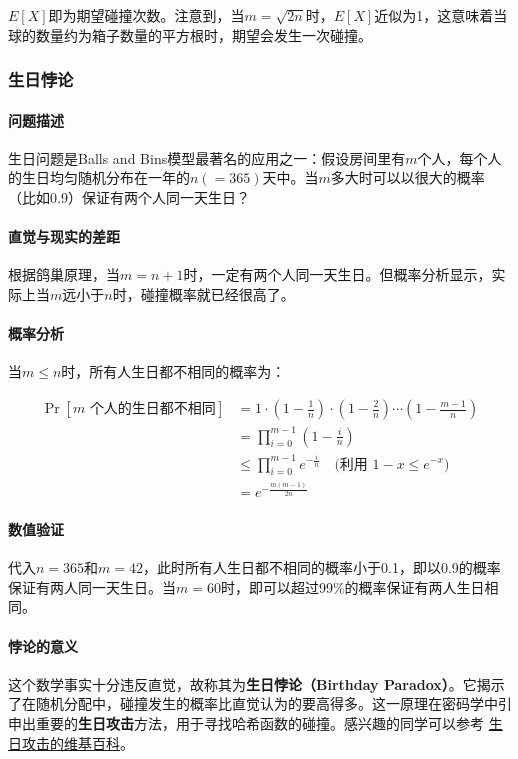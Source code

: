 \documentclass[lang=cn,newtx,10pt,scheme=chinese,chinesefont=nofont,citestyle=gb7714-2015, bibstyle=gb7714-2015]{elegantbook}
\begin{document}
\begin{refsection}
$E[X]$即为期望碰撞次数。注意到，当$m=\sqrt{2n}$时，$E[X]$近似为1，这意味着当球的数量约为箱子数量的平方根时，期望会发生一次碰撞。

\subsubsection{生日悖论}

\paragraph*{问题描述}
生日问题是Balls and Bins模型最著名的应用之一：假设房间里有$m$个人，每个人的生日均匀随机分布在一年的$n(=365)$天中。当$m$多大时可以以很大的概率（比如0.9）保证有两个人同一天生日？

\paragraph*{直觉与现实的差距}
根据鸽巢原理，当$m=n+1$时，一定有两个人同一天生日。但概率分析显示，实际上当$m$远小于$n$时，碰撞概率就已经很高了。

\paragraph*{概率分析}
当$m\le n$时，所有人生日都不相同的概率为：

\begin{align*}
\Pr[\text{$m$ 个人的生日都不相同}] &= 1\cdot\left(1-\frac{1}{n}\right)\cdot\left(1-\frac{2}{n}\right)\cdots\left(1-\frac{m-1}{n}\right) \\
&= \prod_{i=0}^{m-1}\left(1-\frac{i}{n}\right) \\
&\le \prod_{i=0}^{m-1}e^{-\frac{i}{n}} \quad \text{(利用 $1-x \le e^{-x}$)} \\
&= e^{-\frac{m(m-1)}{2n}}
\end{align*}

\paragraph*{数值验证}
代入$n=365$和$m=42$，此时所有人生日都不相同的概率小于0.1，即以0.9的概率保证有两人同一天生日。当$m=60$时，即可以超过99\%的概率保证有两人生日相同。

\paragraph*{悖论的意义}
这个数学事实十分违反直觉，故称其为\textbf{生日悖论（Birthday Paradox）}。它揭示了在随机分配中，碰撞发生的概率比直觉认为的要高得多。这一原理在密码学中引申出重要的\textbf{生日攻击}方法，用于寻找哈希函数的碰撞。感兴趣的同学可以参考 \href{https://en.wikipedia.org/wiki/Birthday_attack}{生日攻击的维基百科}。


\end{refsection}
\end{document}
